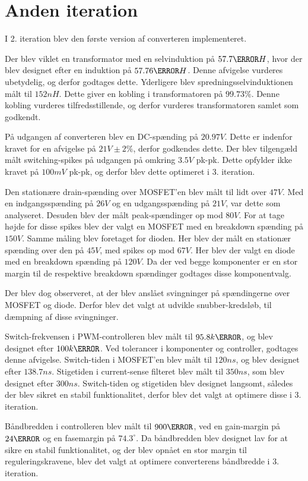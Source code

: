 
\section{Anden iteration}
I 2. iteration blev den første version af converteren implementeret.

Der blev viklet en transformator med en selvinduktion på $57.7\micro H$, hvor der blev designet efter en induktion på $57.76\micro H$. Denne afvigelse vurderes ubetydelig, og derfor godtages dette. Yderligere blev spredningsselvinduktionen målt til $152nH$. Dette giver en kobling i transformatoren på $99.73\percent$. Denne kobling vurderes tilfredsstillende, og derfor vurderes transformatoren samlet som godkendt. 

På udgangen af converteren blev en DC-spænding på $20.97V$. Dette er indenfor kravet for en afvigelse på $21V \pm2\percent$, derfor godkendes dette. Der blev tilgengæld målt switching-spikes på udgangen på omkring $3.5V$ pk-pk. Dette opfylder ikke kravet på $100mV$ pk-pk, og derfor blev dette optimeret i 3. iteration. 

Den stationære drain-spænding over MOSFET'en blev målt til lidt over $47V$. Med en indgangsspænding på $26V$ og en udgangsspænding på $21V$, var dette som analyseret. Desuden blev der målt peak-spændinger op mod $80V$. For at tage højde for disse spikes blev der valgt en MOSFET med en breakdown spænding på $150V$. Samme måling blev foretaget for dioden. Her blev der målt en stationær spænding over den på $45V$, med spikes op mod $67V$. Her blev der valgt en diode med en breakdown spænding på $120V$. Da der ved begge komponenter er en stor margin til de respektive breakdown spændinger godtages disse komponentvalg.

Der blev dog observeret, at der blev anslået svingninger på spændingerne over MOSFET og diode. Derfor blev det valgt at udvikle snubber-kredsløb, til dæmpning af disse svingninger. 

Switch-frekvensen i PWM-controlleren blev målt til $95.8k\hertz$, og blev designet efter $100k\hertz$. Ved tolerancer i komponenter og controller, godtages denne afvigelse. Switch-tiden i MOSFET'en blev målt til $120ns$, og blev designet efter $138.7ns$. Stigetiden i current-sense filteret blev målt til $350ns$, som blev designet efter $300ns$. Switch-tiden og stigetiden blev designet langsomt, således der blev sikret en stabil funktionalitet, derfor blev det valgt at optimere disse i 3. iteration. 

Båndbredden i controlleren blev målt til $900\hertz$, ved en gain-margin på $24\decibel$ og en fasemargin på $74.3^\circ$. Da båndbredden blev designet lav for at sikre en stabil funktionalitet, og der blev opnået en stor margin til reguleringskravene, blev det valgt at optimere converterens båndbredde i 3. iteration. 

